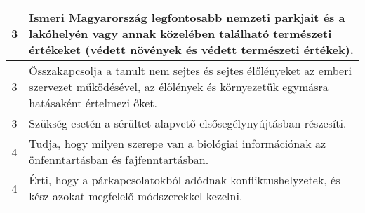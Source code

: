 \begin{longtable}{c | p{12cm} }
                                
                                          3 &  Ismeri Magyarország legfontosabb nemzeti parkjait és a lakóhelyén vagy annak közelében található természeti értékeket (védett növények és védett természeti értékek). \\ \hline
                                          3 &  Összakapcsolja a tanult nem sejtes és sejtes élőlényeket az emberi szervezet működésével, az élőlények és környezetük egymásra hatásaként értelmezi őket. \\ \hline
                                          3 &  Szükség esetén a sérültet alapvető elsősegélynyújtásban részesíti. \\ \hline
                                      
                                
                                          4 &  Tudja, hogy milyen szerepe van a biológiai információnak az önfenntartásban és fajfenntartásban. \\ \hline
                                          4 &  Érti, hogy a párkapcsolatokból adódnak konfliktushelyzetek, és kész azokat megfelelő módszerekkel kezelni. \\ \hline
                                      
                        \end{longtable}
            \clearpage

